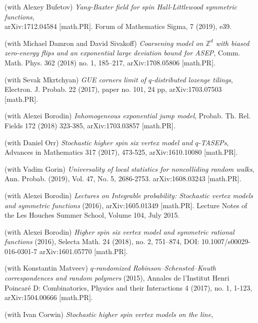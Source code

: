 \documentclass[letterpaper,11pt]{article}
\begin{document}
\begin{etaremune}
	\item (with Alexey Bufetov)
		\emph{Yang-Baxter field for spin Hall-Littlewood symmetric functions},\\
		arXiv:1712.04584 [math.PR]. Forum of Mathematics Sigma, 7 (2019), e39.
	\item
	      (with Michael Damron and David Sivakoff) \emph{Coarsening model
		      on $\mathbb{Z}^d$ with biased zero-energy flips and an exponential large
			deviation bound for ASEP}, 
			Comm. Math. Phys. 362 (2018) no. 1, 185–217,
			arXiv:1708.05806 [math.PR].
					
	\item
	      (with Sevak Mkrtchyan)
	      \emph{GUE corners limit of $q$-distributed lozenge tilings},
				Electron. J. Probab. 22 (2017), paper no. 101, 24 pp,
				arXiv:1703.07503 [math.PR].
	\item
	      (with Alexei Borodin)
	      \emph{Inhomogeneous exponential jump model},
				Probab. Th. Rel. Fields
				172 (2018) 323-385,
				arXiv:1703.03857 [math.PR].
	\item
	      (with Daniel Orr)
	      \emph{Stochastic higher spin six vertex model and $q$-TASEPs},
	      Advances in Mathematics 317 (2017), 473-525, arXiv:1610.10080
	      [math.PR].
			\item
	      (with Vadim Gorin)
	      \emph{Universality of local statistics for noncolliding random
			  walks},
			  Ann. Probab. (2019), Vol. 47, No. 5, 2686-2753.
				arXiv:1608.03243 [math.PR].
	\item
	      (with Alexei Borodin)
	      \emph{Lectures on Integrable probability: Stochastic vertex
		      models and symmetric functions}
	      (2016), arXiv:1605.01349 [math.PR]. Lecture Notes of the Les
	      Houches Summer School, Volume 104, July 2015.
	\item
	      (with Alexei Borodin)
	      \emph{Higher spin six vertex model and symmetric rational
		      functions}
	      (2016),
				Selecta Math. 24 (2018), no. 2, 751--874, DOI: 10.1007/s00029-016-0301-7
	      arXiv:1601.05770 [math.PR].
	\item
	      (with Konstantin Matveev)
	      \emph{$q$-randomized Robinson--Schensted--Knuth correspondences
		      and random polymers}
	      (2015),
	      Annales de l'Institut Henri Poincar\'e D: Combinatorics, Physics
	      and their Interactions 4 (2017), no. 1, 1-123, arXiv:1504.00666 [math.PR].
	\item
	      (with Ivan Corwin)
	      \emph{Stochastic higher spin vertex models on the line},

\end{etaremune}
\end{document}
